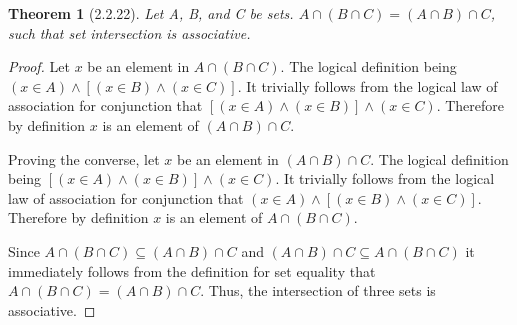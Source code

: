 \documentclass[a4paper, 12pt]{article}
\theoremstyle{plain}
\newtheorem*{theorem*}{Theorem}
\begin{document}
	
	\begin{theorem*}[2.2.22]
		Let A, B, and C be sets. $A \cap (B \cap C) = (A \cap B) \cap C$, such that set intersection is associative.
	\end{theorem*}
	
	\begin{proof}
		Let $x$ be an element in $A \cap (B \cap C)$. The logical definition being \newline $(x \in A) \land [(x \in B) \land (x \in C)]$. It trivially follows from the logical law of association for conjunction that $[(x \in A) \land (x \in B)] \land (x \in C)$. Therefore by definition $x$ is an element of $(A \cap B) \cap C$.
		
		Proving the converse, let $x$ be an element in $(A \cap B) \cap C$. The logical definition being $[(x \in A) \land (x \in B)] \land (x \in C)$. It trivially follows from the logical law of association for conjunction that \newline $(x \in A) \land [(x \in B) \land (x \in C)]$. Therefore by definition $x$ is an element of $A \cap (B \cap C)$.
		
		Since $A \cap (B \cap C) \subseteq (A \cap B) \cap C$ and $(A \cap B) \cap C \subseteq A \cap (B \cap C)$ it immediately follows from the definition for set equality that \newline $A \cap (B \cap C) = (A \cap B) \cap C$. Thus, the intersection of three sets is associative.
	\end{proof}
\end{document}
